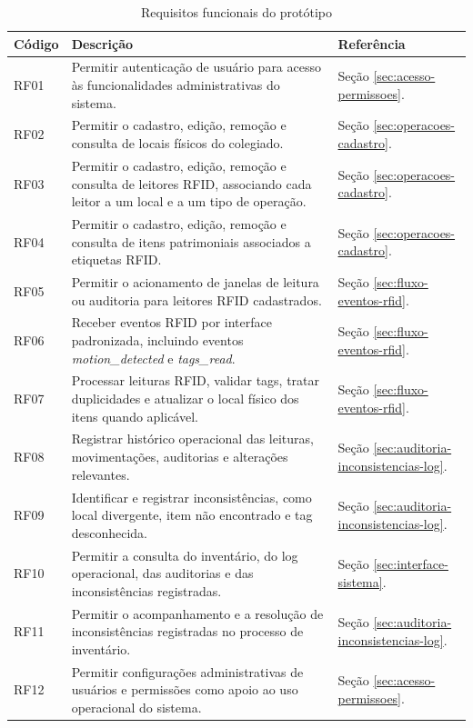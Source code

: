 \begin{table}[H]
\centering
\footnotesize
\setlength{\tabcolsep}{4pt}
\renewcommand{\arraystretch}{1.12}
\caption{Requisitos funcionais do protótipo}
\label{tab:requisitos-funcionais}
\begin{tabularx}{\textwidth}{>{\raggedright\arraybackslash}p{1.3cm}>{\raggedright\arraybackslash}X>{\raggedright\arraybackslash}p{2.35cm}}
\toprule
\textbf{Código} & \textbf{Descrição} & \textbf{Referência} \\
\midrule
RF01 & Permitir autenticação de usuário para acesso às funcionalidades administrativas do sistema. & Seção \ref{sec:acesso-permissoes}. \\
RF02 & Permitir o cadastro, edição, remoção e consulta de locais físicos do colegiado. & Seção \ref{sec:operacoes-cadastro}. \\
RF03 & Permitir o cadastro, edição, remoção e consulta de leitores RFID, associando cada leitor a um local e a um tipo de operação. & Seção \ref{sec:operacoes-cadastro}. \\
RF04 & Permitir o cadastro, edição, remoção e consulta de itens patrimoniais associados a etiquetas RFID. & Seção \ref{sec:operacoes-cadastro}. \\
RF05 & Permitir o acionamento de janelas de leitura ou auditoria para leitores RFID cadastrados. & Seção \ref{sec:fluxo-eventos-rfid}. \\
RF06 & Receber eventos RFID por interface padronizada, incluindo eventos \textit{motion\_detected} e \textit{tags\_read}. & Seção \ref{sec:fluxo-eventos-rfid}. \\
RF07 & Processar leituras RFID, validar tags, tratar duplicidades e atualizar o local físico dos itens quando aplicável. & Seção \ref{sec:fluxo-eventos-rfid}. \\
RF08 & Registrar histórico operacional das leituras, movimentações, auditorias e alterações relevantes. & Seção \ref{sec:auditoria-inconsistencias-log}. \\
RF09 & Identificar e registrar inconsistências, como local divergente, item não encontrado e tag desconhecida. & Seção \ref{sec:auditoria-inconsistencias-log}. \\
RF10 & Permitir a consulta do inventário, do log operacional, das auditorias e das inconsistências registradas. & Seção \ref{sec:interface-sistema}. \\
RF11 & Permitir o acompanhamento e a resolução de inconsistências registradas no processo de inventário. & Seção \ref{sec:auditoria-inconsistencias-log}. \\
RF12 & Permitir configurações administrativas de usuários e permissões como apoio ao uso operacional do sistema. & Seção \ref{sec:acesso-permissoes}. \\
\bottomrule
\end{tabularx}
\end{table}

